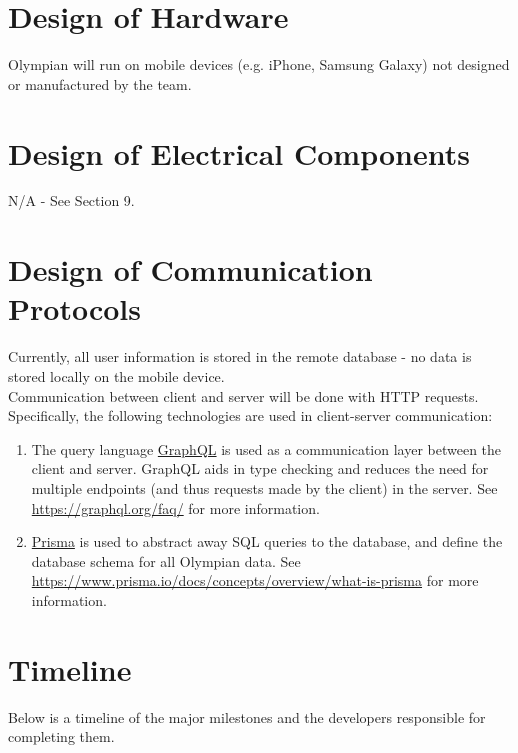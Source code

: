 \documentclass[12pt, titlepage]{article}
\begin{document}
	\section{Design of Hardware}
	
	Olympian will run on mobile devices (e.g. iPhone, Samsung Galaxy) not designed or manufactured by the team.
	
	\section{Design of Electrical Components}
	
	N/A - See Section 9.
	
	\section{Design of Communication Protocols}
	
	Currently, all user information is stored in the remote database - no data is stored locally on the mobile device.\\
	
	Communication between client and server will be done with HTTP requests. Specifically, the following technologies are used in client-server communication:
	
	\begin{enumerate}

	\item The query language \href{https://graphql.org/}{GraphQL} is used as a communication layer between the client and server. GraphQL aids in type checking and reduces the need for multiple endpoints (and thus requests made by the client) in the server. See \url{https://graphql.org/faq/} for more information.
	
	\item \href{https://www.prisma.io/}{Prisma} is used to abstract away SQL queries to the database, and define the database schema for all Olympian data. See \url{https://www.prisma.io/docs/concepts/overview/what-is-prisma} for more information.
	\end{enumerate}
	\section{Timeline}

  Below is a timeline of the major milestones and the developers responsible for completing them.
\end{document}
